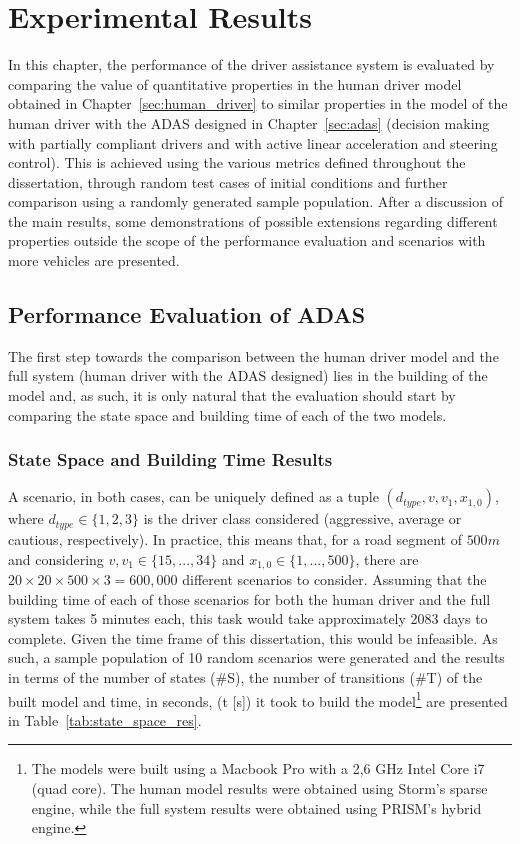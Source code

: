 \chapter{Experimental Results}
\label{sec:results}

In this chapter, the performance of the driver assistance system is evaluated by comparing the value of quantitative properties in the human driver model obtained in Chapter~\ref{sec:human_driver} to similar properties in the model of the human driver with the ADAS designed in Chapter~\ref{sec:adas} (decision making with partially compliant drivers and with active linear acceleration and steering control). This is achieved using the various metrics defined throughout the dissertation, through random test cases of initial conditions and further comparison using a randomly generated sample population. After a discussion of the main results, some demonstrations of possible extensions regarding different properties outside the scope of the performance evaluation and scenarios with more vehicles are presented.

\section{Performance Evaluation of ADAS}

The first step towards the comparison between the human driver model and the full system (human driver with the ADAS designed) lies in the building of the model and, as such, it is only natural that the evaluation should start by comparing the state space and building time of each of the two models.

\subsection{State Space and Building Time Results}
\label{sec:res_state}

A scenario, in both cases, can be uniquely defined as a tuple $(d_{type}, v, v_1, x_{1,0})$, where $d_{type} \in \{1,2,3\}$ is the driver class considered (aggressive, average or cautious, respectively). In practice, this means that, for a road segment of $500m$ and considering $v, v_1 \in \{15,...,34\}$ and $x_{1,0} \in \{1,...,500\}$, there are $20 \times 20 \times 500 \times 3 = 600,000$ different scenarios to consider. Assuming that the building time of each of those scenarios for both the human driver and the full system takes 5 minutes each, this task would take approximately 2083 days to complete. Given the time frame of this dissertation, this would be infeasible. As such, a sample population of 10 random scenarios were generated and the results in terms of the number of states (\#S), the number of transitions (\#T) of the built model and time, in seconds, (t [s]) it took to build the model\footnote{The models were built using a Macbook Pro with a 2,6 GHz Intel Core i7 (quad core). The human model results were obtained using Storm's sparse engine, while the full system results were obtained using PRISM's hybrid engine.} are presented in Table~\ref{tab:state_space_res}.

